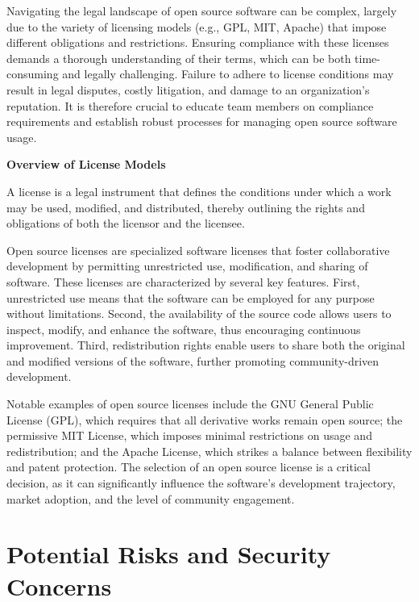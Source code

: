 Navigating the legal landscape of open source software can be complex, largely due to the variety of licensing models (e.g., GPL, MIT, Apache) that impose different obligations and restrictions. Ensuring compliance with these licenses demands a thorough understanding of their terms, which can be both time-consuming and legally challenging. Failure to adhere to license conditions may result in legal disputes, costly litigation, and damage to an organization’s reputation. It is therefore crucial to educate team members on compliance requirements and establish robust processes for managing open source software usage.

\cite{lice-com-new}

\textbf{Overview of License Models}

A license is a legal instrument that defines the conditions under which a work may be used, modified, and distributed, thereby outlining the rights and obligations of both the licensor and the licensee.

Open source licenses are specialized software licenses that foster collaborative development by permitting unrestricted use, modification, and sharing of software. These licenses are characterized by several key features. First, unrestricted use means that the software can be employed for any purpose without limitations. Second, the availability of the source code allows users to inspect, modify, and enhance the software, thus encouraging continuous improvement. Third, redistribution rights enable users to share both the original and modified versions of the software, further promoting community-driven development.

Notable examples of open source licenses include the GNU General Public License (GPL), which requires that all derivative works remain open source; the permissive MIT License, which imposes minimal restrictions on usage and redistribution; and the Apache License, which strikes a balance between flexibility and patent protection. The selection of an open source license is a critical decision, as it can significantly influence the software’s development trajectory, market adoption, and the level of community engagement.

\cite{Software-Licensing-Types-Thales}


\section{Potential Risks and Security Concerns}

